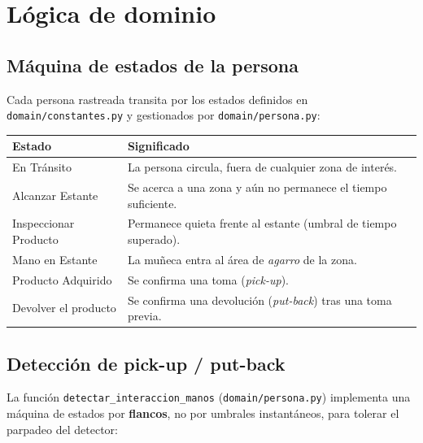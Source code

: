 \documentclass[11pt,a4paper]{report}
\begin{document}
\chapter{Lógica de dominio}

\section{Máquina de estados de la persona}

Cada persona rastreada transita por los estados definidos en
\texttt{domain/constantes.py} y gestionados por \texttt{domain/persona.py}:

\begin{center}
\begin{tabular}{ll}
\toprule
\rowcolor{rvCodeBg}\textbf{Estado} & \textbf{Significado} \\
\midrule
En Tránsito & La persona circula, fuera de cualquier zona de interés. \\
Alcanzar Estante & Se acerca a una zona y aún no permanece el tiempo suficiente. \\
Inspeccionar Producto & Permanece quieta frente al estante (umbral de tiempo superado). \\
Mano en Estante & La muñeca entra al área de \textit{agarro} de la zona. \\
Producto Adquirido & Se confirma una toma (\textit{pick-up}). \\
Devolver el producto & Se confirma una devolución (\textit{put-back}) tras una toma previa. \\
\bottomrule
\end{tabular}
\end{center}

\section{Detección de pick-up / put-back}

La función \texttt{detectar\_interaccion\_manos} (\texttt{domain/persona.py}) implementa una
máquina de estados por \textbf{flancos}, no por umbrales instantáneos, para tolerar el
parpadeo del detector:
\end{document}
